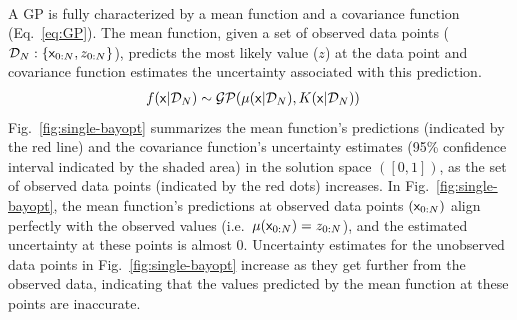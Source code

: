 \

A GP is fully characterized by a mean function and a covariance function (Eq.~\ref{eq:GP}).
The mean function, given a set of observed data points ($\mathcal{D}_{N}:\{ {\mathsf{x}}_{0:N}, z_{0:N}\}$), predicts the most likely value ($z$) at the data point  and covariance function estimates the uncertainty associated with this prediction.
\begin{align}\label{eq:GP}
	f({\mathsf{x}}|\mathcal{D}_N) &\sim \mathcal{GP} ( \mu({\mathsf{x}}|\mathcal{D}_N) , K( {\mathsf{x}}|\mathcal{D}_N) ) 
\end{align}
Fig.~\ref{fig:single-bayopt}  summarizes the mean function's predictions (indicated by the red line) and the covariance function's uncertainty estimates (95\% confidence interval indicated by the shaded area) in the solution space $([0,1])$, as the set of observed data points (indicated by the red dots) increases.
In Fig.~\ref{fig:single-bayopt}, the mean function's predictions at observed data points $({\mathsf{x}}_{0:N})$ align perfectly with the observed values (i.e.\ $\mu({\mathsf{x}}_{0:N}) = z_{0:N}$), and the estimated uncertainty at these points is almost 0.
Uncertainty estimates for the unobserved data points in Fig.~\ref{fig:single-bayopt} increase as they get further from the observed data, indicating that the values predicted by the mean function at these points are inaccurate.

\

